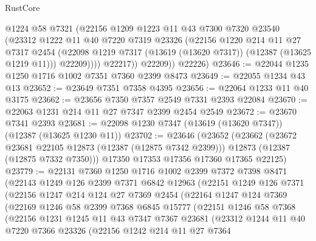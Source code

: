 \begin{lexlean}{RustCore}
\begin{coremodule}
                @1224
                @58
                @7321
                (@22156
                  @1209
                  @1223
                  @11
                  @43
                  @7300
                  @7320
                  @23540
                  (@23312
                    @1222
                    @11
                    @40
                    @7220
                    @7319
                    @23326
                    (@22156
                      @1220
                      @214
                      @11
                      @27
                      @7317
                      @2454
                      (@22098 @1219 @7317 (@13619 (@13620 @7317)) (@12387 (@13625 @1219 @11)))
                      @22209))))
              @22217))
          @22209))
      @22226)
@23646 := @22044 @1235 @1250 @1716 @1002 @7351 @7360 @2399 @8473
@23649 := @22055 @1234 @43 @13
@23652 := @23649 @7351 @7358 @4395
@23656 := @22064 @1233 @11 @40 @3175
@23662 := @23656 @7350 @7357 @2549 @7331 @2393 @22084
@23670 := @22063 @1231 @214 @11 @27 @7347 @2399 @2454 @2549
@23672 := @23670 @7341 @2393
@23681 := @22098 @1230 @7347 (@13619 (@13620 @7347)) (@12387 (@13625 @1230 @11))
@23702 := @23646
    (@23652
      (@23662
        (@23672 @23681 @22105 @12873 (@12387 (@12875 @7342 @2399)))
        @12873
        (@12387 (@12875 @7332 @7350)))
      @17350
      @17353
      @17356
      @17360
      @17365
      @22125)
@23779 := @22131
    @7360
    @1250
    @1716
    @1002
    @2399
    @7372
    @7398
    @8471
    (@22143
      @1249
      @126
      @2399
      @7371
      @6842
      @12963
      (@22151
        @1249
        @126
        @7371
        (@22156
          @1247
          @214
          @124
          @27
          @7369
          @2454
          (@22164
            @1247
            @124
            @7369
            (@22169
              @1246
              @58
              @2399
              @7368
              @6845
              @15777
              (@22151
                @1246
                @58
                @7368
                (@22156
                  @1231
                  @1245
                  @11
                  @43
                  @7347
                  @7367
                  @23681
                  (@23312
                    @1244
                    @11
                    @40
                    @7220
                    @7366
                    @23326
                    (@22156
                      @1242
                      @214
                      @11
                      @27
                      @7364

\end{coremodule}
\end{lexlean}
